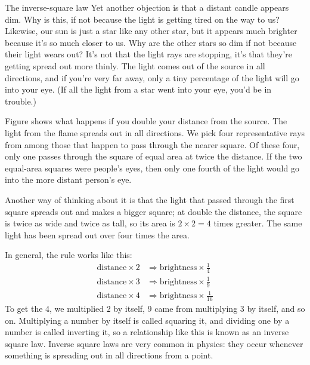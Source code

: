 \begin{envsubsection}{The inverse-square law}
Yet another objection is that a distant candle appears dim. Why is this, if not
because the light is getting tired on the way to us? Likewise, our sun is just
a star like any other star, but it appears much brighter because it's so much
closer to us. Why are the other stars so dim if not because their light wears out?
It's not that the light rays are stopping, it's that they're
getting spread out more thinly. The light comes out of the source in all directions, and if you're
very far away, only a tiny percentage of the light will go into your eye. (If all the
light from a star went into your eye, you'd be in trouble.)



Figure  shows what happens if you double your distance from the source. The
light from the flame spreads out in all directions. We pick four
representative rays from among those
that happen to pass through the nearer square. Of these four,
only one passes through the square of equal area at twice the distance. If the
two equal-area squares were people's eyes, then only one fourth of the light would
go into the more distant person's eye.


Another way
of thinking about it is that the light that passed through the first square spreads
out and makes a bigger square; at double the distance, the square is twice as wide and
twice as tall, so its area is $2\times2=4$ times greater. The same light has been spread
out over four times the area.

In general,
the rule works like this:
\begin{align*}
	\text{distance}\times2 &\Rightarrow \text{brightness}\times\frac{1}{4}\\
	\text{distance}\times3 &\Rightarrow \text{brightness}\times\frac{1}{9}\\
	\text{distance}\times4 &\Rightarrow \text{brightness}\times\frac{1}{16}
\end{align*}
To get the 4, we multiplied 2 by itself, 9 came from multiplying 3 by itself, and so on.
Multiplying a number by itself is called squaring it, and dividing one by a number
is called inverting it, so a relationship like this is known as an inverse square law.
Inverse square laws are very common in physics: they occur whenever something is spreading
out in all directions from a point.


\end{envsubsection}
